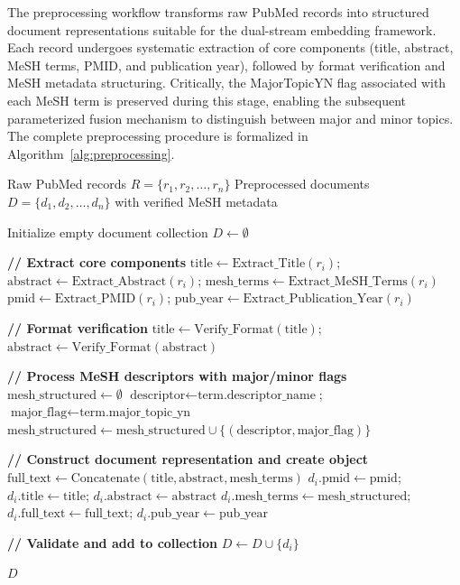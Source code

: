 \documentclass[authorproof,JACIII,researchpaper]{fujipressarticle}
\begin{document}
The preprocessing workflow transforms raw PubMed records into structured document representations suitable for the dual-stream embedding framework. Each record undergoes systematic extraction of core components (title, abstract, MeSH terms, PMID, and publication year), followed by format verification and MeSH metadata structuring. Critically, the MajorTopicYN flag associated with each MeSH term is preserved during this stage, enabling the subsequent parameterized fusion mechanism to distinguish between major and minor topics. The complete preprocessing procedure is formalized in Algorithm~\ref{alg:preprocessing}.

\begin{algorithm*}[t]
\caption{Biomedical Document Preprocessing for Transformer-Based Embeddings}
\label{alg:preprocessing}
\begin{algorithmic}[1]
\Require Raw PubMed records $R = \{r_1, r_2, \ldots, r_n\}$
\Ensure Preprocessed documents $D = \{d_1, d_2, \ldots, d_n\}$ with verified MeSH metadata

\State Initialize empty document collection $D \gets \emptyset$

    \State \textbf{// Extract core components}
    \State $\text{title} \gets \text{Extract\_Title}(r_i)$; $\text{abstract} \gets \text{Extract\_Abstract}(r_i)$; $\text{mesh\_terms} \gets \text{Extract\_MeSH\_Terms}(r_i)$
    \State $\text{pmid} \gets \text{Extract\_PMID}(r_i)$; $\text{pub\_year} \gets \text{Extract\_Publication\_Year}(r_i)$

    \State \textbf{// Format verification}
    \State $\text{title} \gets \text{Verify\_Format}(\text{title})$; $\text{abstract} \gets \text{Verify\_Format}(\text{abstract})$

    \State \textbf{// Process MeSH descriptors with major/minor flags}
    \State $\text{mesh\_structured} \gets \emptyset$
        \State $\text{descriptor} \gets \text{term.descriptor\_name}$; $\text{major\_flag} \gets \text{term.major\_topic\_yn}$
        \State $\text{mesh\_structured} \gets \text{mesh\_structured} \cup \{(\text{descriptor}, \text{major\_flag})\}$
    \EndFor

    \State \textbf{// Construct document representation and create object}
    \State $\text{full\_text} \gets \text{Concatenate}(\text{title}, \text{abstract}, \text{mesh\_terms})$
    \State $d_i.\text{pmid} \gets \text{pmid}$; $d_i.\text{title} \gets \text{title}$; $d_i.\text{abstract} \gets \text{abstract}$
    \State $d_i.\text{mesh\_terms} \gets \text{mesh\_structured}$; $d_i.\text{full\_text} \gets \text{full\_text}$; $d_i.\text{pub\_year} \gets \text{pub\_year}$

    \State \textbf{// Validate and add to collection}
        \State $D \gets D \cup \{d_i\}$
    \EndIf
\EndFor

\State \Return $D$
\end{algorithmic}
\end{algorithm*}
\end{document}

